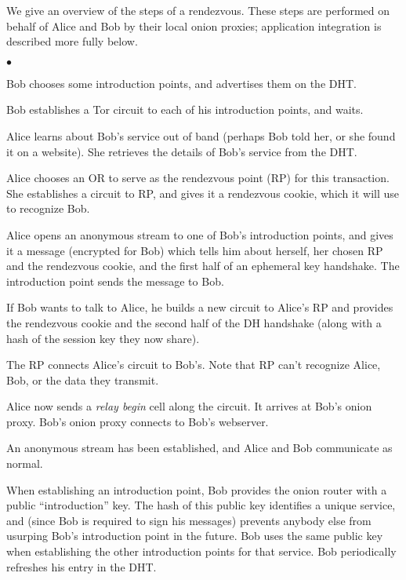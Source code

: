 \documentclass[times,10pt,twocolumn]{article}
\newenvironment{tightlist}{\begin{list}{$\bullet$}{
  \setlength{\itemsep}{0mm}
    \setlength{\parsep}{0mm}
    }}{\end{list}}
\begin{document}
We give an overview of the steps of a rendezvous. These steps are
performed on behalf of Alice and Bob by their local onion proxies;
application integration is described more fully below.
\begin{tightlist}
\item Bob chooses some introduction points, and advertises them on
      the DHT.
\item Bob establishes a Tor circuit to each of his introduction points,
      and waits.
\item Alice learns about Bob's service out of band (perhaps Bob told her,
      or she found it on a website). She retrieves the details of Bob's
      service from the DHT.
\item Alice chooses an OR to serve as the rendezvous point (RP) for this
      transaction. She establishes a circuit to RP, and gives it a
      rendezvous cookie, which it will use to recognize Bob.
\item Alice opens an anonymous stream to one of Bob's introduction
      points, and gives it a message (encrypted for Bob) which tells him
      about herself, her chosen RP and the rendezvous cookie, and the
      first half of an ephemeral
      key handshake. The introduction point sends the message to Bob.
\item If Bob wants to talk to Alice, he builds a new circuit to Alice's
      RP and provides the rendezvous cookie and the second half of the DH
      handshake (along with a hash of the session key they now share).
\item The RP connects Alice's circuit to Bob's. Note that RP can't
      recognize Alice, Bob, or the data they transmit.
\item Alice now sends a \emph{relay begin} cell along the circuit. It
      arrives at Bob's onion proxy. Bob's onion proxy connects to Bob's
      webserver.
\item An anonymous stream has been established, and Alice and Bob
      communicate as normal.
\end{tightlist}

When establishing an introduction point, Bob provides the onion router
with a public ``introduction'' key. The hash of this public key
identifies a unique service, and (since Bob is required to sign his
messages) prevents anybody else from usurping Bob's introduction point
in the future. Bob uses the same public key when establishing the other
introduction points for that service. Bob periodically refreshes his
entry in the DHT.
\end{document}
